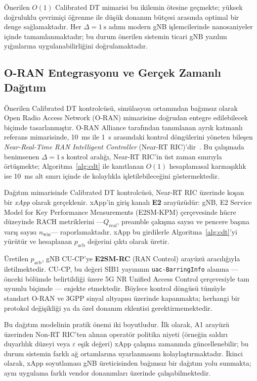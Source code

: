 \documentclass[conference]{IEEEtran}
\newcommand{\qreal}{Q_{\mathrm{real}}}
\newcommand{\pacb}{p_{\mathrm{acb}}}
\begin{document}
Önerilen $O(1)$ Calibrated DT mimarisi bu ikilemin ötesine geçmekte; yüksek
doğruluklu çevrimiçi öğrenme ile düşük donanım bütçesi arasında optimal bir
denge sağlamaktadır. Her $\Delta = 1\ \mathrm{s}$ adımı modern gNB
işlemcilerinde nanosaniyeler içinde tamamlanmaktadır; bu durum önerilen
sistemin ticari gNB yazılım yığınlarına uygulanabilirliğini doğrulamaktadır.

\subsection{O-RAN Entegrasyonu ve Gerçek Zamanlı Dağıtım}

Önerilen Calibrated DT kontrolcüsü, simülasyon ortamından bağımsız olarak
Open Radio Access Network (O-RAN) mimarisine doğrudan entegre edilebilecek
biçimde tasarlanmıştır. O-RAN Alliance tarafından tanımlanan ayrık katmanlı
referans mimarisinde, 10~ms ile 1~s arasındaki kontrol döngülerini yöneten
bileşen \emph{Near-Real-Time RAN Intelligent Controller} (Near-RT
RIC)'dir~\cite{b14}. Bu çalışmada benimsenen $\Delta = 1\ \mathrm{s}$ kontrol
aralığı, Near-RT RIC'in üst zaman sınırıyla örtüşmekte; Algoritma~\ref{alg:cdt}
ile kanıtlanan $O(1)$ hesaplamasal karmaşıklık ise 10~ms alt sınırı içinde de
kolaylıkla işletilebileceğini göstermektedir.

Dağıtım mimarisinde Calibrated DT kontrolcüsü, Near-RT RIC üzerinde koşan
bir \emph{xApp} olarak gerçeklenir. xApp'in giriş kanalı \textbf{E2}
arayüzüdür: gNB, E2 Service Model for Key Performance Measurements
(E2SM-KPM) çerçevesinde hücre düzeyinde RACH metriklerini
---$\qreal$, preamble çakışma sayısı ve pencere başına varış
sayısı $n_{\mathrm{win}}$--- raporlamaktadır. xApp bu girdilerle
Algoritma~\ref{alg:cdt}'yi yürütür ve hesaplanan $\pacb$ değerini çıktı
olarak üretir.

Üretilen $\pacb$, gNB CU-CP'ye \textbf{E2SM-RC} (RAN Control) arayüzü
aracılığıyla iletilmektedir. CU-CP, bu değeri SIB1 yayınının
\texttt{uac-BarringInfo} alanına --- önceki bölümde belirtildiği üzere 5G NR
Unified Access Control çerçevesiyle tam uyumlu biçimde --- enjekte etmektedir.
Böylece kontrol döngüsü tümüyle standart O-RAN ve 3GPP sinyal altyapısı
üzerinde kapanmakta; herhangi bir protokol değişikliği ya da özel donanım
eklentisi gerektirmemektedir.

Bu dağıtım modelinin pratik önemi iki boyutludur. İlk olarak, A1 arayüzü
üzerinden Non-RT RIC'ten alınan operatör politika niyeti (örneğin saldırı
duyarlılık düzeyi veya $\varepsilon$ eşik değeri) xApp çalışma zamanında
güncellenebilir; bu durum sistemin farklı ağ ortamlarına uyarlanmasını
kolaylaştırmaktadır. İkinci olarak, xApp soyutlaması gNB üreticisinden
bağımsız bir dağıtım yolu sunmakta; aynı uygulama farklı vendor donanımları
üzerinde çalışabilmektedir.
\end{document}
